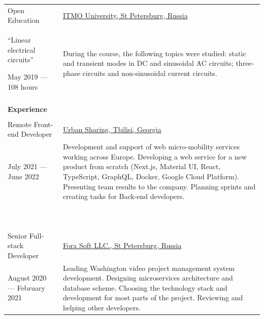 \documentclass[12pt]{article}
\begin{document}
\begin{tabularx}{500pt}{eX}
        Open Education & \underline{ITMO University, St Petersburg, Russia} \\

        ``Linear electrical circuits''

        May 2019 --- 108 hours

        & During the course, the following topics were studied: static and transient modes in DC and sinusoidal AC circuits;
        three-phase circuits and non-sinusoidal current circuits.

        \\

        &\\

        \textbf{Experience} & \\

        &\\

        Remote Front-end Developer & \underline{Urban Sharing, Tbilisi, Georgia} \\

        July 2021 --- June 2022

        & Development and support of web micro-mobility services working across Europe.
        Developing a web service for a new product from scratch (Next.js, Material UI, React, TypeScript, GraphQL, Docker, Google Cloud Platform).
        Presenting team results to the company.
        Planning sprints and creating tasks for Back-end developers.

        \\

        &\\
        &\\
        &\\
        &\\
        &\\
        &\\
        &\\
        &\\
        &\\
        &\\

        Senior Full-stack Developer & \underline{Fora Soft LLC., St Petersburg, Russia} \\

        August 2020 --- February 2021

        & Leading Washington video project management system development.
        Designing microservices architecture and database scheme.
        Choosing the technology stack and development for most parts of the project.
        Reviewing and helping other developers.


\end{tabularx}
\end{document}
